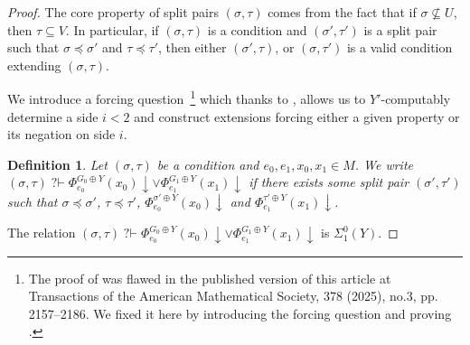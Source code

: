 \documentclass{article}
\numberwithin{theorem}{section}
\newtheorem{lemma}[theorem]{Lemma}
\newtheorem{definition}[theorem]{Definition}
\newcommand{\qvdash}{\operatorname{{?}{\vdash}}}
\newcommand{\nqvdash}{\operatorname{{?}{\nvdash}}}
\begin{document}
\begin{proof}
The core property of split pairs $(\sigma, \tau)$ comes from the fact that if $\sigma \not \subseteq U$, then $\tau \subseteq V$. In particular, if $(\sigma, \tau)$ is a condition and $(\sigma', \tau')$ is a split pair such that $\sigma \preceq \sigma'$ and $\tau \preceq \tau'$, then either $(\sigma', \tau)$, or $(\sigma, \tau')$ is a valid condition extending $(\sigma, \tau)$.


We introduce a forcing question~\footnote{The proof of  was flawed in the published version of this article at Transactions of the American Mathematical Society, 378 (2025), no.3, pp. 2157--2186. We fixed it here by introducing the forcing question and proving .} which thanks to , allows us to $Y'$-computably determine a side $i < 2$ and construct extensions forcing either a given property or its negation on side $i$.

\begin{definition}
    Let $(\sigma, \tau)$ be a condition and $e_0, e_1, x_0, x_1 \in M$. We write $(\sigma, \tau) \qvdash \Phi_{e_0}^{G_0 \oplus Y}(x_0) \downarrow \vee \Phi_{e_1}^{G_1 \oplus Y}(x_1) \downarrow$ if there exists some split pair $(\sigma', \tau')$ such that $\sigma \preceq \sigma'$, $\tau \preceq \tau'$, $\Phi_{e_0}^{\sigma' \oplus Y}(x_0) \downarrow$ and $\Phi_{e_1}^{\tau' \oplus Y}(x_1) \downarrow$. 
\end{definition}

The relation $(\sigma, \tau) \qvdash \Phi_{e_0}^{G_0 \oplus Y}(x_0) \downarrow \vee \Phi_{e_1}^{G_1 \oplus Y}(x_1) \downarrow$ is $\Sigma^0_1(Y)$. 



\end{proof}
\end{document}
